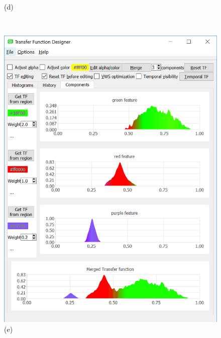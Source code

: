 \documentclass[twoside,twocolumn,10pt]{article}
\begin{document}
\begin{figure}
\begin{minipage}{.33\textwidth}
		(d)
	\end{minipage}~
	\begin{minipage}{.33\textwidth}
		\centering
		\includegraphics[width=1\linewidth]{tf_vortex_merged_segment_blend_green_red_purple}
		(e)
	\end{minipage}~
	\begin{minipage}{.33\textwidth}
		\centering

\end{minipage}
\end{figure}
\end{document}
